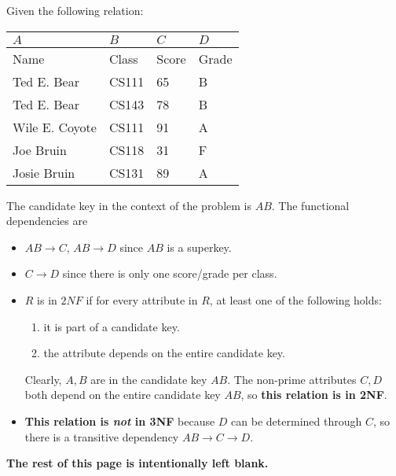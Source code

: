 \documentclass{report}
\newenvironment{example}{\begin{tcolorbox}[title={Example},colback=green!5!white,colframe=black!75!green]}{\end{tcolorbox}}
\renewcommand{\bf}[1]{\textbf{{#1}}}
\newcommand{\ib}[1]{\textit{\textbf{{#1}}}}
\begin{document}
\begin{example}
    Given the following relation:
    \begin{center}
        \begin{tabular}{l|l|l|l}
            $A$ & $B$ & $C$ & $D$ \\
            \hline
            Name & Class & Score & Grade \\
            \hline
            Ted E. Bear & CS111 & 65 & B \\
            Ted E. Bear & CS143 & 78 & B \\
            Wile E. Coyote & CS111 & 91 & A \\
            Joe Bruin & CS118 & 31 & F \\
            Josie Bruin & CS131 & 89 & A \\
        \end{tabular}
    \end{center}
    \noindent The candidate key in the context of the problem is $AB$. The functional dependencies
    are
    \begin{itemize}[label=$\to$]
        \item $AB \to C$, $AB \to D$ since $AB$ is a superkey.
        \item $C \to D$ since there is only one score/grade per class.
        \item $R$ is in $2NF$ if for every attribute in $R$, at least one of the
            following holds:
            \begin{enumerate}[label=(\arabic*)]
                \item it is part of a candidate key.
                \item the attribute depends on the entire candidate key.
            \end{enumerate}
            Clearly, $A, B$ are in the candidate key $AB$. The non-prime
            attributes $C, D$ both depend on the entire candidate key $AB$, so
            \bf{this relation is in 2NF}.
        \item \bf{This relation is \ib{not} in 3NF} because $D$ can be
            determined through $C$, so there is a transitive dependency $AB \to
            C \to D$.
    \end{itemize}
\end{example}
\vspace{5em}

\begin{center}
    \bf{The rest of this page is intentionally left blank.}
\end{center}
\end{document}
